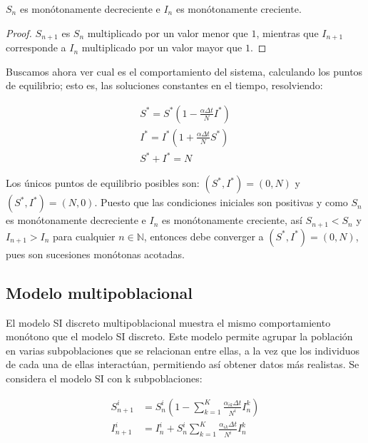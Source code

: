 \begin{lemma}
$S_n$ es monótonamente decreciente e $I_n$ es monótonamente creciente.
\end{lemma}

\begin{proof}
$S_{n+1}$ es $S_n$ multiplicado por un valor menor que $1$, mientras que $I_{n+1}$ corresponde a $I_n$ multiplicado por un valor mayor que $1$.
\end{proof}

Buscamos ahora ver cual es el comportamiento del sistema, calculando los puntos de equilibrio; esto es, las soluciones constantes en el tiempo, resolviendo:

$$
\begin{aligned}
S^*=S^*\left( 1-\frac{\alpha\Delta t}{N}I^*\right) \\
I^*=I^*\left( 1+\frac{\alpha\Delta t}{N}S^*\right) \\
S^*+I^*=N
\end{aligned}
$$

Los únicos puntos de equilibrio posibles son: $(S^*,I^*)=(0,N)$ y $(S^*,I^*)=(N,0)$. Puesto que las condiciones iniciales son positivas y como $S_n$ es monótonamente decreciente e $I_n$ es monótonamente creciente, así $S_{n+1}<S_n$ y $I_{n+1}>I_n$ para cualquier $n\in\mathbb{N}$, entonces debe converger a $(S^*,I^*)=(0,N)$, pues son sucesiones monótonas acotadas.

\subsection{Modelo multipoblacional}

El modelo SI discreto multipoblacional muestra el mismo comportamiento monótono que el modelo SI discreto. Este modelo permite agrupar la población en varias subpoblaciones que se relacionan entre ellas, a la vez que los individuos de cada una de ellas interactúan, permitiendo así obtener datos más realistas. Se considera el modelo SI con k subpoblaciones:

\begin{equation}
\label{eqn: SI multipoblational}
\begin{aligned}
S_{n+1}^i &= S_n^i \left( 1- \sum_{k=1}^{K} \frac{\alpha_{ik}\Delta t}{N^i}I_n^k \right) \\
I_{n+1}^i &= I_n^i + S_n^i \sum_{k=1}^{K} \frac{\alpha_{ik}\Delta t}{N^i}I_n^k
\end {aligned}
\end{equation}

